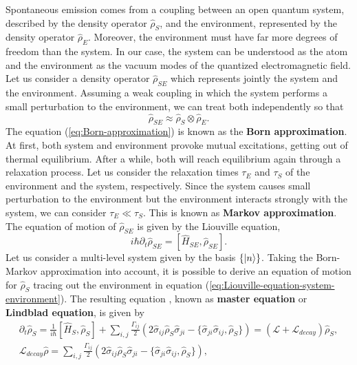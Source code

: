 Spontaneous emission comes from a coupling between an open quantum system, described by the density operator $ \hat{\rho}_S $, and the environment, represented by the density operator $ \hat{\rho}_E $. Moreover, the environment must have far more degrees of freedom than the system. In our case, the system can be understood as the atom and the environment as the vacuum modes of the quantized electromagnetic field. Let us consider a density operator $ \hat{\rho}_{SE} $ which represents jointly the system and the environment. Assuming a weak coupling in which the system performs a small perturbation to the environment, we can treat both independently so that
\begin{equation}
	\hat{\rho}_{SE} \approx \hat{\rho}_S \otimes \hat{\rho}_E.
	\label{eq:Born-approximation}
\end{equation}
The equation (\ref{eq:Born-approximation}) is known as the \textbf{Born approximation}. At first, both system and environment provoke mutual excitations, getting out of thermal equilibrium. After a while, both will reach equilibrium again through a relaxation process. Let us consider the relaxation times $ \tau_E $ and $ \tau_S $ of the environment and the system, respectively. Since the system causes small perturbation to the environment but the environment interacts strongly with the system, we can consider $ \tau_E \ll \tau_S $. This is known as \textbf{Markov approximation}. The equation of motion of $ \hat{\rho}_{SE} $ is given by the Liouville equation,
\begin{equation}
	i \hbar \partial_t \hat{\rho}_{SE} = [\hat{H}_{SE}, \hat{\rho}_{SE}].
	\label{eq:Liouville-equation-system-environment}
\end{equation}
Let us consider a multi-level system given by the basis $\{\ket{n}\}$. Taking the Born-Markov approximation into account, it is possible to derive an equation of motion for $ \hat{\rho}_S $ tracing out the environment in equation (\ref{eq:Liouville-equation-system-environment}). The resulting equation \cite{brasil2013simple}, known as \textbf{master equation} or \textbf{Lindblad equation}, is given by
\begin{gather}
	\partial_t \hat{\rho}_S = \frac{1}{i\hbar} [\hat{H}_S, \hat{\rho}_S] + \sum_{i,j} \frac{\Gamma_{ij}}{2}(2\hat{\sigma}_{ij}\hat{\rho}_{S}\hat{\sigma}_{ji} - \{\hat{\sigma}_{ji}\hat{\sigma}_{ij}, \hat{\rho}_{S}\}) = (\mathcal{L} + \mathcal{L}_{decay}) \hat{\rho}_S,
	\label{eq:Lindblad-equation}
	\\
	\mathcal{L}_{decay}\hat{\rho} = \sum_{i,j} \frac{\Gamma_{ij}}{2}(2\hat{\sigma}_{ij}\hat{\rho}_{S}\hat{\sigma}_{ji} - \{\hat{\sigma}_{ji}\hat{\sigma}_{ij}, \hat{\rho}_{S}\}),
	\label{eq:Lindblad-superoperator}
\end{gather}
